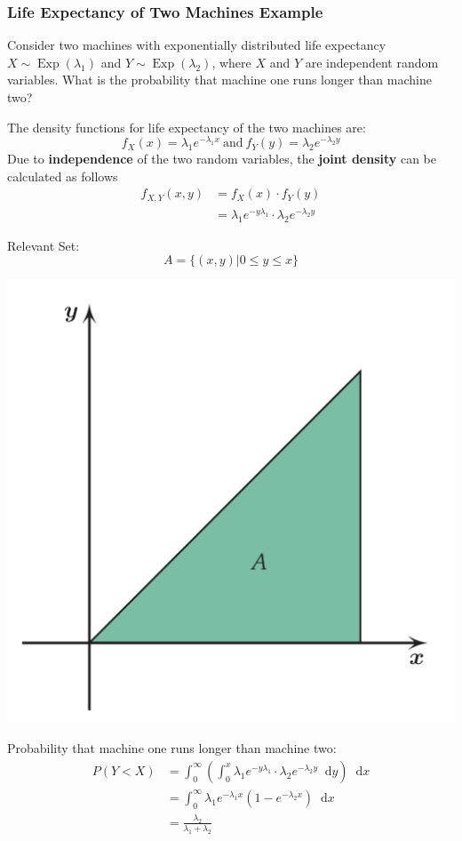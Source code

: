 \documentclass[11pt]{article}
\newcommand*\diff{\mathop{}\!\mathrm{d}}
\newcommand*\Exp[1]{\mathop{\text{Exp}}\left(#1\right)}
\begin{document}
\subsubsection{Life Expectancy of Two Machines Example}
Consider two machines with exponentially distributed life expectancy $X\sim \Exp{\lambda_1}$ and $Y\sim\Exp{\lambda_2}$, where $X$ and $Y$ are independent random variables. What is the probability that machine one runs longer than machine two?

The density functions for life expectancy of the two machines are:
\begin{equation*}
	f_X(x) = \lambda_1 e^{-\lambda_1 x}\ \text{and}\ f_Y(y) = \lambda_2 e^{-\lambda_2 y}
\end{equation*}
Due to \textbf{independence} of the two random variables, the \textbf{joint density} can be calculated as follows
\begin{align}
	f_{X,Y} (x,y) &= f_X(x) \cdot f_Y(y)\\
	&= \lambda_1 e^{-y\lambda_1} \cdot \lambda_2 e^{-\lambda_2 y}
\end{align}
\begin{minipage}{0.6\linewidth}
	Relevant Set:
	\begin{equation*}
		A = \{(x,y)|0\leq y\leq x\}
	\end{equation*}
\end{minipage}
\begin{minipage}{0.4\linewidth}
	\begin{center}
		\includegraphics[width=0.6\linewidth]{img/area_A_under_xy}
	\end{center}	
\end{minipage}
Probability that machine one runs longer than machine two:
\begin{align*}
	P(Y<X) &= \int_{0}^{\infty}(\int_{0}^{x} \lambda_1 e^{-y\lambda_1} \cdot \lambda_2 e^{-\lambda_2 y} \diff y )\diff x\\
	&= \int_{0}^{\infty} \lambda_1e^{-\lambda_1 x} (1 - e^{-\lambda_2 x})\diff x\\
	&= \frac{\lambda_2}{\lambda_1 + \lambda_2}
\end{align*}
\end{document}
